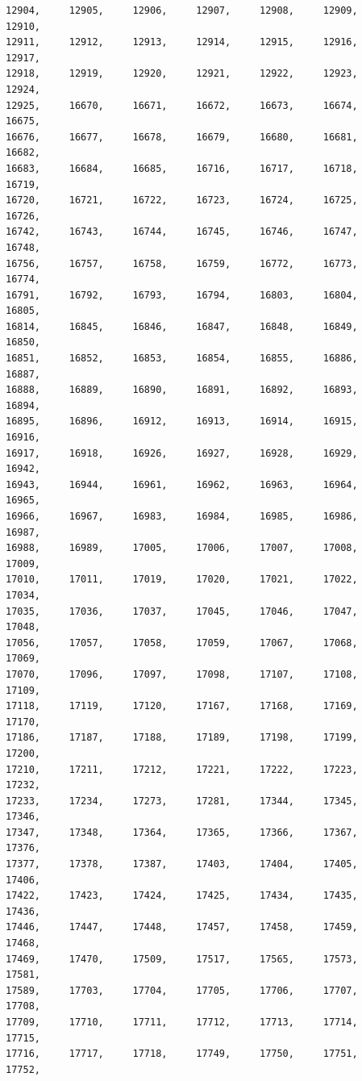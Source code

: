 \documentclass[a4paper,11pt]{report}
\begin{document}
\begin{verbatim}
12904,     12905,     12906,     12907,     12908,     12909,     12910,     
12911,     12912,     12913,     12914,     12915,     12916,     12917,     
12918,     12919,     12920,     12921,     12922,     12923,     12924,     
12925,     16670,     16671,     16672,     16673,     16674,     16675,     
16676,     16677,     16678,     16679,     16680,     16681,     16682,     
16683,     16684,     16685,     16716,     16717,     16718,     16719,     
16720,     16721,     16722,     16723,     16724,     16725,     16726,     
16742,     16743,     16744,     16745,     16746,     16747,     16748,     
16756,     16757,     16758,     16759,     16772,     16773,     16774,     
16791,     16792,     16793,     16794,     16803,     16804,     16805,     
16814,     16845,     16846,     16847,     16848,     16849,     16850,     
16851,     16852,     16853,     16854,     16855,     16886,     16887,     
16888,     16889,     16890,     16891,     16892,     16893,     16894,     
16895,     16896,     16912,     16913,     16914,     16915,     16916,     
16917,     16918,     16926,     16927,     16928,     16929,     16942,     
16943,     16944,     16961,     16962,     16963,     16964,     16965,     
16966,     16967,     16983,     16984,     16985,     16986,     16987,     
16988,     16989,     17005,     17006,     17007,     17008,     17009,     
17010,     17011,     17019,     17020,     17021,     17022,     17034,     
17035,     17036,     17037,     17045,     17046,     17047,     17048,     
17056,     17057,     17058,     17059,     17067,     17068,     17069,     
17070,     17096,     17097,     17098,     17107,     17108,     17109,     
17118,     17119,     17120,     17167,     17168,     17169,     17170,     
17186,     17187,     17188,     17189,     17198,     17199,     17200,     
17210,     17211,     17212,     17221,     17222,     17223,     17232,     
17233,     17234,     17273,     17281,     17344,     17345,     17346,     
17347,     17348,     17364,     17365,     17366,     17367,     17376,     
17377,     17378,     17387,     17403,     17404,     17405,     17406,     
17422,     17423,     17424,     17425,     17434,     17435,     17436,     
17446,     17447,     17448,     17457,     17458,     17459,     17468,     
17469,     17470,     17509,     17517,     17565,     17573,     17581,     
17589,     17703,     17704,     17705,     17706,     17707,     17708,     
17709,     17710,     17711,     17712,     17713,     17714,     17715,     
17716,     17717,     17718,     17749,     17750,     17751,     17752,     

\end{verbatim}
\end{document}
